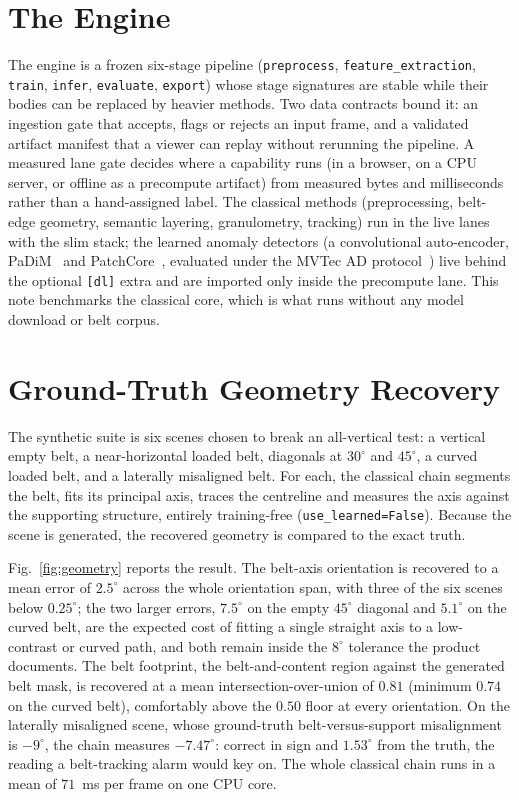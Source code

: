 \documentclass[journal]{IEEEtran}
\begin{document}
\section{The Engine}\label{sec:engine}

The engine is a frozen six-stage pipeline (\texttt{preprocess}, \texttt{feature\_extraction}, \texttt{train},
\texttt{infer}, \texttt{evaluate}, \texttt{export}) whose stage signatures are stable while their bodies can be
replaced by heavier methods. Two data contracts bound it: an ingestion gate that accepts, flags or rejects
an input frame, and a validated artifact manifest that a viewer can replay without rerunning the pipeline. A
measured lane gate decides where a capability runs (in a browser, on a CPU server, or offline as a precompute
artifact) from measured bytes and milliseconds rather than a hand-assigned label. The classical methods
(preprocessing, belt-edge geometry, semantic layering, granulometry, tracking) run in the live lanes with the slim
stack; the learned anomaly detectors (a convolutional auto-encoder, PaDiM~\cite{padim} and
PatchCore~\cite{patchcore}, evaluated under the MVTec AD protocol~\cite{mvtec}) live behind the optional
\texttt{[dl]} extra and are imported only inside the precompute lane. This note benchmarks the classical core,
which is what runs without any model download or belt corpus.

\section{Ground-Truth Geometry Recovery}\label{sec:geometry}

The synthetic suite is six scenes chosen to break an all-vertical test: a vertical empty belt, a near-horizontal
loaded belt, diagonals at $30^\circ$ and $45^\circ$, a curved loaded belt, and a laterally misaligned belt. For
each, the classical chain segments the belt, fits its principal axis, traces the centreline and measures the axis
against the supporting structure, entirely training-free (\texttt{use\_learned=False}). Because the scene is
generated, the recovered geometry is compared to the exact truth.

Fig.~\ref{fig:geometry} reports the result. The belt-axis orientation is recovered to a mean error of $2.5^\circ$
across the whole orientation span, with three of the six scenes below $0.25^\circ$; the two larger errors,
$7.5^\circ$ on the empty $45^\circ$ diagonal and $5.1^\circ$ on the curved belt, are the expected cost of fitting a
single straight axis to a low-contrast or curved path, and both remain inside the $8^\circ$ tolerance
the product documents. The belt footprint, the belt-and-content region against the generated belt mask, is
recovered at a mean intersection-over-union of $0.81$ (minimum $0.74$ on the curved belt), comfortably above the
$0.50$ floor at every orientation. On the laterally misaligned scene, whose ground-truth belt-versus-support
misalignment is $-9^\circ$, the chain measures $-7.47^\circ$: correct in sign and $1.53^\circ$ from the truth,
the reading a belt-tracking alarm would key on. The whole classical chain runs in a mean of $71$~ms per frame on
one CPU core.
\end{document}
